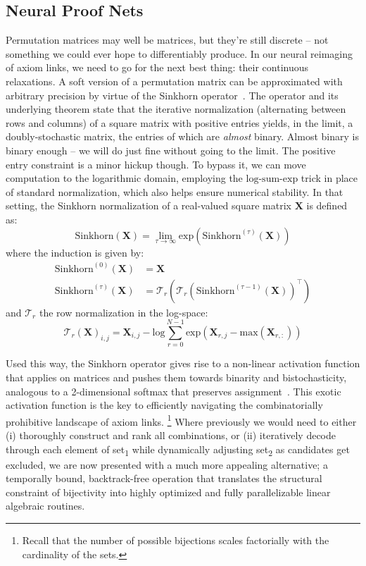 \subsection{Neural Proof Nets}
Permutation matrices may well be matrices, but they're still discrete -- not something we could ever hope to differentiably produce.
In our neural reimaging of axiom links, we need to go for the next best thing: their continuous relaxations.
A soft version of a permutation matrix can be approximated with arbitrary precision by virtue of the Sinkhorn operator~\cite{sinkhorn1964relationship}.
The operator and its underlying theorem state that the iterative normalization (alternating between rows and columns) of a square matrix with positive entries yields, in the limit, a doubly-stochastic matrix, the entries of which are \textit{almost} binary.
Almost binary is binary enough -- we will do just fine without going to the limit.
The positive entry constraint is a minor hickup though.
To bypass it, we can move computation to the logarithmic domain, employing the $\mathrm{log}$-$\mathrm{sum}$-$\mathrm{exp}$ trick in place of standard normalization, which also helps ensure numerical stability.
In that setting, the Sinkhorn normalization of a real-valued square matrix $\mathbf{X}$ is defined as:
\begin{equation}
\mathrm{Sinkhorn}(\mathbf{X})= \lim_{\tau \to \infty}\mathrm{exp}\left(\mathrm{Sinkhorn}^{(\tau)}(\mathbf{X})\right)
\end{equation}
where the induction is given by:
\begin{align}
    \mathrm{Sinkhorn}^{(0)}(\mathbf{X}) &= \mathbf{X} \\
    \mathrm{Sinkhorn}^{(\tau)}(\mathbf{X}) &= \mathcal{T}_r\left(\mathcal{T}_r\left(\mathrm{Sinkhorn}^{(\tau-1)}(\mathbf{X})\right)^\top\right)
\end{align}
and $\mathcal{T}_r$ the row normalization in the log-space:
\begin{equation}
{\mathcal{T}_r(\mathbf{X})}_{i, j} = \mathbf{X}_{i, j} - \mathrm{log}\sum\limits_{r=0}^{N-1}{\mathrm{exp}{(\mathbf{X}_{r, j} - \mathrm{max}(\mathbf{X}_{r, :}))}}
\end{equation}

Used this way, the Sinkhorn operator gives rise to a non-linear activation function that applies on matrices and pushes them towards binarity and bistochasticity, analogous to a 2-dimensional softmax that preserves assignment~\cite{mena2018learning}.
This exotic activation function is the key to efficiently navigating the combinatorially prohibitive landscape of axiom links.%
	\footnote{Recall that the number of possible bijections scales factorially with the cardinality of the sets.}
Where previously we would need to either (i) thoroughly construct and rank all combinations, or (ii) iteratively decode through each element of set\textsubscript{1} while dynamically adjusting set\textsubscript{2} as candidates get excluded, we are now presented with a much more appealing alternative; a temporally bound, backtrack-free operation that translates the structural constraint of bijectivity into highly optimized and fully parallelizable linear algebraic routines.

